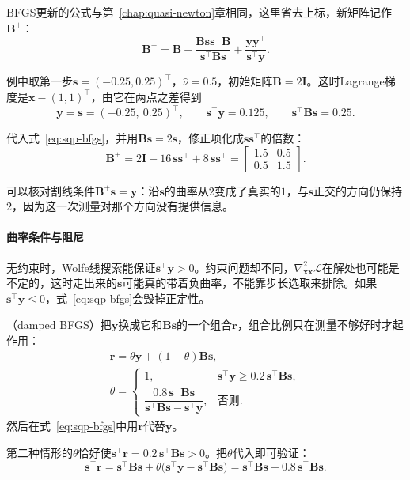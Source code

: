 BFGS更新的公式与第~\ref{chap:quasi-newton}章相同，这里省去上标，新矩阵记作$\bm{B}^{+}$：
\begin{equation}
 \bm{B}^{+}=\bm{B}-\frac{\bm{B}\bm{s}\bm{s}^\top\bm{B}}{\bm{s}^\top\bm{B}\bm{s}}+\frac{\bm{y}\bm{y}^\top}{\bm{s}^\top\bm{y}}.
 \label{eq:sqp-bfgs}
\end{equation}

例中取第一步$\bm{s}=(-0.25,0.25)^\top$，$\hat\nu=0.5$，初始矩阵$\bm{B}=2\bm{I}$。这时Lagrange梯度是$\bm{x}-(1,1)^\top$，由它在两点之差得到
\[
 \bm{y}=\bm{s}=(-0.25,\ 0.25)^\top,\qquad\bm{s}^\top\bm{y}=0.125,\qquad\bm{s}^\top\bm{B}\bm{s}=0.25.
\]

代入式~\eqref{eq:sqp-bfgs}，并用$\bm{B}\bm{s}=2\bm{s}$，修正项化成$\bm{s}\bm{s}^\top$的倍数：
\[
 \bm{B}^{+}=2\bm{I}-16\,\bm{s}\bm{s}^\top+8\,\bm{s}\bm{s}^\top
 =\begin{bmatrix}1.5&0.5\\0.5&1.5\end{bmatrix}.
\]

可以核对割线条件$\bm{B}^{+}\bm{s}=\bm{y}$：沿$\bm{s}$的曲率从$2$变成了真实的$1$，与$\bm{s}$正交的方向仍保持$2$，因为这一次测量对那个方向没有提供信息。

\paragraph{曲率条件与阻尼}
无约束时，Wolfe线搜索能保证$\bm{s}^\top\bm{y}>0$。约束问题却不同，$\nabla^2_{\bm{x}\bm{x}}\mathcal{L}$在解处也可能是不定的，这时走出来的$\bm{s}$可能真的带着负曲率，不能靠步长选取来排除。如果$\bm{s}^\top\bm{y}\leq0$，式~\eqref{eq:sqp-bfgs}会毁掉正定性。

（damped BFGS）把$\bm{y}$换成它和$\bm{B}\bm{s}$的一个组合$\bm{r}$，组合比例只在测量不够好时才起作用：
\begin{equation}
 \begin{gathered}
 \bm{r}=\theta\bm{y}+(1-\theta)\bm{B}\bm{s},\\
 \theta=\begin{cases}
 1, & \bm{s}^\top\bm{y}\geq0.2\,\bm{s}^\top\bm{B}\bm{s},\\
 \dfrac{0.8\,\bm{s}^\top\bm{B}\bm{s}}{\bm{s}^\top\bm{B}\bm{s}-\bm{s}^\top\bm{y}}, & \text{否则}.
 \end{cases}
 \end{gathered}
 \label{eq:sqp-damped}
\end{equation}
然后在式~\eqref{eq:sqp-bfgs}中用$\bm{r}$代替$\bm{y}$。

第二种情形的$\theta$恰好使$\bm{s}^\top\bm{r}=0.2\,\bm{s}^\top\bm{B}\bm{s}>0$。把$\theta$代入即可验证：
\[
 \bm{s}^\top\bm{r}=\bm{s}^\top\bm{B}\bm{s}+\theta\bigl(\bm{s}^\top\bm{y}-\bm{s}^\top\bm{B}\bm{s}\bigr)=\bm{s}^\top\bm{B}\bm{s}-0.8\,\bm{s}^\top\bm{B}\bm{s}.
\]

